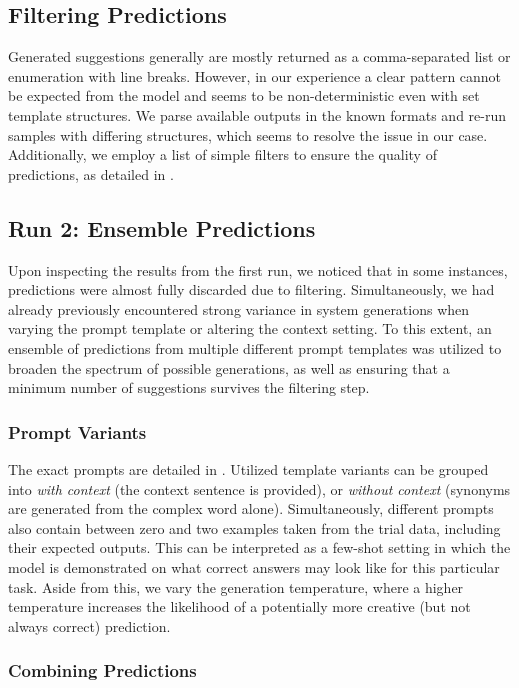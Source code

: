 \documentclass[11pt]{article}
\begin{document}
\subsection{Filtering Predictions}
Generated suggestions generally are mostly returned as a comma-separated list or enumeration with line breaks. However, in our experience a clear pattern cannot be expected from the model and seems to be non-deterministic even with set template structures. We parse available outputs in the known formats and re-run samples with differing structures, which seems to resolve the issue in our case. Additionally, we employ a list of simple filters to ensure the quality of predictions, as detailed in .

\subsection{Run 2: Ensemble Predictions}
Upon inspecting the results from the first run, we noticed that in some instances, predictions were almost fully discarded due to filtering.
Simultaneously, we had already previously encountered strong variance in system generations when varying the prompt template or altering the context setting.
To this extent, an ensemble of predictions from multiple different prompt templates was utilized to broaden the spectrum of possible generations, as well as ensuring that a minimum number of suggestions survives the filtering step.

\subsubsection{Prompt Variants}

The exact prompts are detailed in .
Utilized template variants can be grouped into \emph{with context} (the context sentence is provided), or \emph{without context} (synonyms are generated from the complex word alone).
Simultaneously, different prompts also contain between zero and two examples taken from the trial data, including their expected outputs. This can be interpreted as a few-shot setting in which the model is demonstrated on what correct answers may look like for this particular task.
Aside from this, we vary the generation temperature, where a higher temperature increases the likelihood of a potentially more creative (but not always correct) prediction.

\subsubsection{Combining Predictions}
\end{document}
